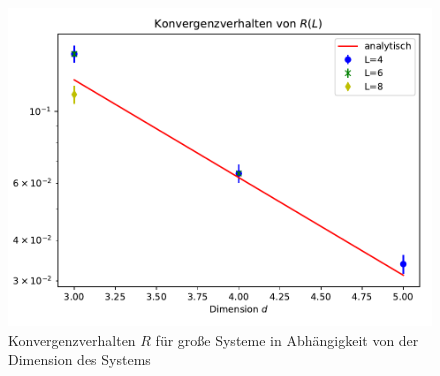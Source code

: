 \documentclass[10pt,a4paper]{article}
\begin{document}
\begin{figure}
  \centering
  \includegraphics[width=\textwidth]{../figures/conv_nd.pdf}
  \caption{Konvergenzverhalten $R$ für große Systeme in Abhängigkeit von der Dimension des Systems}\label{fig:cnd}
\end{figure}
\end{document}

